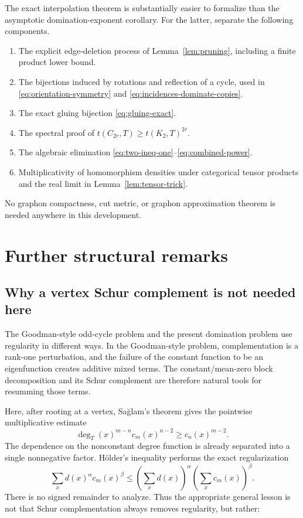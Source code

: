 \documentclass[11pt]{article}
\newcommand{\1}{\mathbf{1}}
\begin{document}
The exact interpolation theorem is substantially easier to formalize than the
asymptotic domination-exponent corollary.  For the latter, separate the
following components.

\begin{enumerate}[label=\textbf{D\arabic*.},leftmargin=2.4em]
\item The explicit edge-deletion process of
Lemma~\ref{lem:pruning}, including a finite product lower bound.
\item The bijections induced by rotations and reflection of a cycle, used in
\eqref{eq:orientation-symmetry} and
\eqref{eq:incidences-dominate-copies}.
\item The exact gluing bijection
\eqref{eq:gluing-exact}.
\item The spectral proof of
$t(C_{2r},T)\ge t(K_2,T)^{2r}$.
\item The algebraic elimination
\eqref{eq:two-ineq-one}--\eqref{eq:combined-power}.
\item Multiplicativity of homomorphism densities under categorical tensor
products and the real limit in Lemma~\ref{lem:tensor-trick}.
\end{enumerate}

No graphon compactness, cut metric, or graphon approximation theorem is needed
anywhere in this development.

\section{Further structural remarks}

\subsection{Why a vertex Schur complement is not needed here}

The Goodman-style odd-cycle problem and the present domination problem use
regularity in different ways.  In the Goodman-style problem, complementation
is a rank-one perturbation, and the failure of the constant function to be an
eigenfunction creates additive mixed terms.  The constant/mean-zero block
decomposition and its Schur complement are therefore natural tools for
resumming those terms.

Here, after rooting at a vertex, Sa\u{g}lam's theorem gives the pointwise
multiplicative estimate
\[
  \deg_T(x)^{m-n}c_m(x)^{n-2}
  \ge c_n(x)^{m-2}.
\]
The dependence on the nonconstant degree function is already separated into a
single nonnegative factor.  H\"older's inequality performs the exact
regularization
\[
  \sum_x d(x)^\alpha c_m(x)^\beta
  \le
  \left(\sum_xd(x)\right)^\alpha
  \left(\sum_xc_m(x)\right)^\beta.
\]
There is no signed remainder to analyze.  Thus the appropriate general lesson
is not that Schur complementation always removes regularity, but rather:
\end{document}
